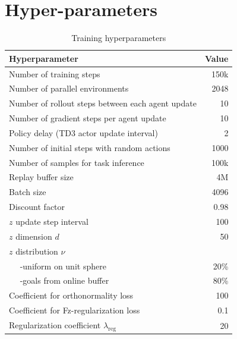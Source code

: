 \section{Hyper-parameters}
\label{appendix:hyperparams}

\begin{table}[H]
\centering
\small
\setlength{\tabcolsep}{12pt}
\renewcommand{\arraystretch}{1.15}
\begin{tabular}{l r}
\toprule
\textbf{Hyperparameter} & \textbf{Value} \\
\midrule
Number of training steps& 150k\\
Number of parallel environments & 2048\\
Number of rollout steps between each agent update & 10\\
Number of gradient steps per agent update & 10\\
Policy delay (TD3 actor update interval) & 2 \\
Number of initial steps with random actions & 1000\\
 Number of samples for task inference&100k\\
Replay buffer size & 4M\\
Batch size & 4096\\
Discount factor & 0.98 \\
 $z$ update step interval&100\\
 $z$ dimension $d$&50\\
 $z$ distribution $\nu$&\\
 ~~ -uniform on unit sphere&20\%\\
 ~~ -goals from online buffer&80\%\\
 Coefficient for orthonormality loss&100\\
 Coefficient for Fz-regularization loss&0.1\\
 Regularization coefficient $\lambda_\text{reg}$&20\\
\bottomrule
\end{tabular}
\caption{Training hyperparameters}
\label{tab:train_hparams}
\end{table}





